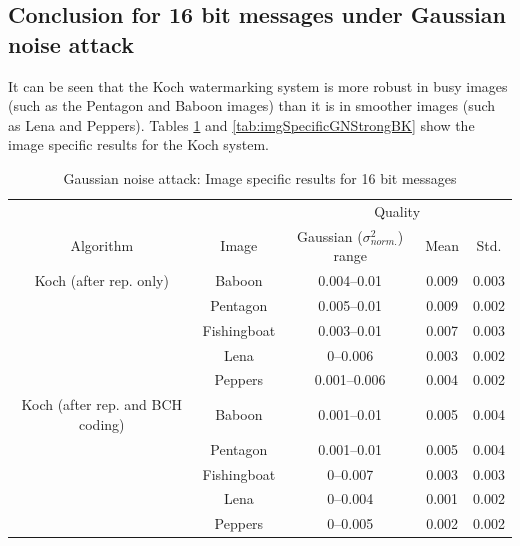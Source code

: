 \documentclass[12pt]{report}
\begin{document}
\subsection{Conclusion for 16 bit messages under Gaussian noise attack}
\label{sec:gn16resultsConcBK}
It can be seen that the Koch watermarking system is more robust in busy images (such as
the Pentagon and Baboon images) than it is in smoother images (such as Lena and Peppers).
Tables \ref{tab:imgSpecificGNBK} and \ref{tab:imgSpecificGNStrongBK} show the image specific results for the
Koch system.
\begin{table}[htb]
\scriptsize
        \begin{center}
                \begin{tabular}{|c|c|c|c|c|} \hline
					& 				& \multicolumn{3}{c|}{Quality} \\ \cline{3-5}
                Algorithm       	& Image         		& Gaussian ($\sigma_{norm.}^{2}$) range    & Mean     & Std. \\ \hline\hline
                Koch (after rep. only)  & Baboon        		& 0.004--0.01                 & 0.009           &0.003  \\ \cline{2-5}
               				& Pentagon 			& 0.005--0.01                 & 0.009            &0.002   \\ \cline{2-5} 
               				& Fishingboat  			& 0.003--0.01                 & 0.007           &0.003   \\ \cline{2-5} 
               				& Lena 				& 0--0.006                    & 0.003           &0.002   \\ \cline{2-5} 
               				& Peppers      			& 0.001--0.006                & 0.004           &0.002   \\ \hline\hline

                Koch (after rep. and BCH coding)& Baboon        & 0.001--0.01                & 0.005            &0.004   \\ \cline{2-5} 
                				& Pentagon      & 0.001--0.01                & 0.005            &0.004  \\ \cline{2-5} 
                				& Fishingboat   & 0--0.007                   & 0.003            &0.003  \\ \cline{2-5} 
                				& Lena          & 0--0.004                   & 0.001            &0.002   \\ \cline{2-5} 
                				& Peppers       & 0--0.005                   & 0.002            &0.002   \\ \hline
        \end{tabular}
        \caption{Gaussian noise attack: Image specific results for 16 bit messages}
        \label{tab:imgSpecificGNBK}
        \end{center}
\end{table}
\end{document}

